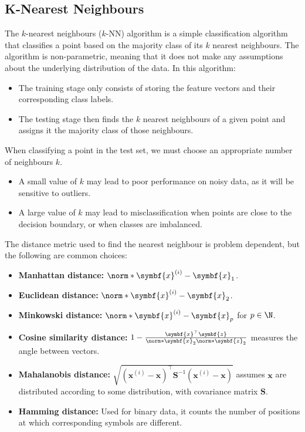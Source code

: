 \documentclass{article}
\begin{document}
\subsection{K-Nearest Neighbours}
The \(k\)-nearest neighbours (\(k\)-NN) algorithm is a simple
classification algorithm that classifies a point based on the majority
class of its \(k\) nearest neighbours. The algorithm is non-parametric,
meaning that it does not make any assumptions about the underlying
distribution of the data. In this algorithm:
\begin{itemize}
    \item The training stage only consists of storing the feature
          vectors and their corresponding class labels.
    \item The testing stage then finds the \(k\) nearest neighbours of
          a given point and assigns it the majority class of those
          neighbours.
\end{itemize}
When classifying a point in the test set, we must choose an appropriate
number of neighbours \(k\).
\begin{itemize}
    \item A small value of \(k\) may lead to poor performance on noisy
          data, as it will be sensitive to outliers.
    \item A large value of \(k\) may lead to misclassification when
          points are close to the decision boundary, or when classes
          are imbalanced.
\end{itemize}
The distance metric used to find the nearest neighbour is problem
dependent, but the following are common choices:
\begin{itemize}
    \item \textbf{Manhattan distance:} \(\norm*{\symbf{x}^{\left( i \right)} - \symbf{x}}_1\).
    \item \textbf{Euclidean distance:} \(\norm*{\symbf{x}^{\left( i \right)} - \symbf{x}}_2\).
    \item \textbf{Minkowski distance:} \(\norm*{\symbf{x}^{\left( i \right)} - \symbf{x}}_p\) for \(p \in \N\).
    \item \textbf{Cosine similarity distance:} \(1 - \frac{\symbf{x}^\top \symbf{z}}{\norm*{\symbf{x}}_2 \norm*{\symbf{z}}_2}\) measures the angle between vectors.
    \item \textbf{Mahalanobis distance:} \(\sqrt{{\left( \symbf{x}^{\left( i \right)} - \symbf{x} \right)}^\top \symbf{S}^{-1} \left( \symbf{x}^{\left( i \right)} - \symbf{x} \right)}\) assumes \(\symbf{x}\) are distributed according to some distribution, with covariance matrix \(\symbf{S}\).
    \item \textbf{Hamming distance:} Used for binary data, it counts the number of positions at which corresponding symbols are different.
\end{itemize}
\end{document}
